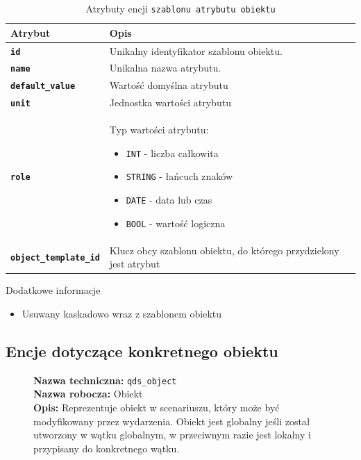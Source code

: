 \begin{table}[H]
    \centering
    \renewcommand{\arraystretch}{1.6}
    \begin{tabular}{|>{\bfseries}l|p{}|}
        \hline
        \rowcolor[HTML]{EFEFEF} \textbf{Atrybut} & \textbf{Opis} \\
        \hline
        \texttt{id} & Unikalny identyfikator szablonu obiektu. \\
        \hline
        \texttt{name} & Unikalna nazwa atrybutu. \\
        \hline
        \texttt{default\_value} & Wartość domyślna atrybutu \\
        \hline
        \texttt{unit} & Jednostka wartości atrybutu \\
        \hline
        \texttt{role} & Typ wartości atrybutu:
        \begin{itemize}
            \item \texttt{INT} - liczba całkowita
            \item \texttt{STRING} - łańcuch znaków
            \item \texttt{DATE} - data lub czas 
            \item \texttt{BOOL} - wartość logiczna
        \end{itemize} \\
        \hline
        \texttt{object\_template\_id} & Klucz obcy szablonu obiektu, do którego przydzielony jest atrybut \\
        \hline
    \end{tabular}
    \caption{Atrybuty encji \texttt{szablonu atrybutu obiektu}}
\end{table}

Dodatkowe informacje
\begin{itemize}
    \item Usuwany kaskadowo wraz z szablonem obiektu
\end{itemize}

\subsection{Encje dotyczące konkretnego obiektu}

\begin{figure}[H]
    \centering
    \begin{minipage}{0.8\textwidth} 
        \begin{framed}
            \noindent\textbf{\large Nazwa techniczna:} \texttt{qds\_object} \\
            \textbf{\large Nazwa robocza:} Obiekt \\
            \textbf{\large Opis:} Reprezentuje obiekt w scenariuszu, który może być modyfikowany przez wydarzenia.
            Obiekt jest globalny jeśli został utworzony w wątku globalnym, w przeciwnym razie jest lokalny 
            i przypisany do konkretnego wątku.
        \end{framed}
    \end{minipage}
\end{figure}

